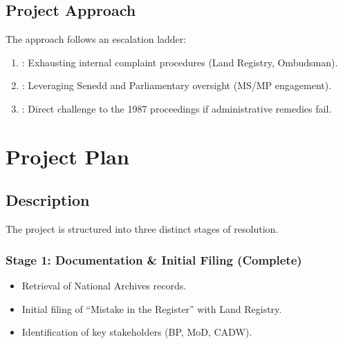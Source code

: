 \documentclass[letterpaper,10pt,openany,oneside,english]{sphinxmanual}
\begin{document}
\section{Project Approach}
\label{\detokenize{brief:project-approach}}
\sphinxAtStartPar
The approach follows an escalation ladder:
\begin{enumerate}
%
\item {} 
\sphinxAtStartPar
{}: Exhausting internal complaint procedures (Land Registry, Ombudsman).

\item {} 
\sphinxAtStartPar
{}: Leveraging Senedd and Parliamentary oversight (MS/MP engagement).

\item {} 
\sphinxAtStartPar
{}: Direct challenge to the 1987 proceedings if administrative remedies fail.

\end{enumerate}

\sphinxstepscope


\chapter{Project Plan}
\label{\detokenize{plan:project-plan}}\label{\detokenize{plan::doc}}

\section{Description}
\label{\detokenize{plan:description}}
\sphinxAtStartPar
The project is structured into three distinct stages of resolution.


\subsection{Stage 1: Documentation \& Initial Filing (Complete)}
\label{\detokenize{plan:stage-1-documentation-initial-filing-complete}}\begin{itemize}
\item {} 
\sphinxAtStartPar
Retrieval of National Archives records.

\item {} 
\sphinxAtStartPar
Initial filing of “Mistake in the Register” with Land Registry.

\item {} 
\sphinxAtStartPar
Identification of key stakeholders (BP, MoD, CADW).

\end{itemize}
\end{document}
